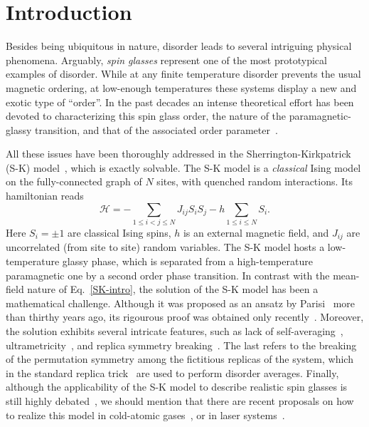 \documentclass[twocolumn,superscriptaddress,prb,10pt]{revtex4-1}
\begin{document}

\maketitle


\section{Introduction}


Besides being ubiquitous in nature, disorder leads to several intriguing 
physical phenomena. 
Arguably, \emph{spin glasses} represent one of the most prototypical examples
of disorder.
While at any finite temperature disorder prevents the 
usual magnetic ordering, at low-enough temperatures these systems display a 
new and exotic type of ``order''. In the past decades an intense theoretical 
effort has been devoted to characterizing this spin glass order, the nature of 
the paramagnetic-glassy transition, and that of the associated order 
parameter~\cite{binder-1986,parisi-book,young-1998,nishimori-book,castellani-2005}. 

All these issues have been thoroughly addressed in the Sherrington-Kirkpatrick 
(S-K) model~\cite{sherrington-1978,sherrington-1978-prl}, which is exactly 
solvable. The S-K model is a \emph{classical} Ising model on the fully-connected 
graph of $N$ sites, with quenched random interactions. Its hamiltonian reads  
%
\begin{equation}
{\mathcal H}=-\sum\limits_{1\le i<j\le N}J_{ij}S_i S_j-
h\sum\limits_{1\le i\le N}S_i.
\label{SK-intro}
\end{equation}
%
Here $S_i=\pm 1$ are classical Ising spins, $h$ is an external magnetic field, and 
$J_{ij}$ are uncorrelated (from site to site) random variables. The S-K model hosts 
a low-temperature glassy phase, which is separated from a high-temperature paramagnetic 
one by a second order phase transition. In contrast with the mean-field nature of 
Eq.~\eqref{SK-intro}, the solution of the S-K model has been a mathematical challenge. 
Although it was proposed as an ansatz by Parisi~\cite{parisi-1980} more than thirthy 
years ago, its rigourous proof was obtained only recently~\cite{talagrand-2006}. Moreover, 
the solution exhibits several intricate features, such as lack of self-averaging~\cite{pastur-1991}, 
ultrametricity~\cite{mezard-1984,rammal-1986}, and replica symmetry breaking~\cite{parisi-book,
castellani-2005}. The last refers to the breaking of the permutation symmetry among the 
fictitious replicas of the system, which in the standard replica trick~\cite{cardy-book} are 
used to perform disorder averages. Finally, although the applicability of the S-K 
model to describe realistic spin glasses is still highly debated~\cite{yucesoy-2012,
billoire-2012,yucesoy-2013}, we should mention that there are recent proposals on how to 
realize this model in cold-atomic gases~\cite{morrison-2008,rotondo-2015}, or in laser 
systems~\cite{ghofraniha-2015}. 
\end{document}

